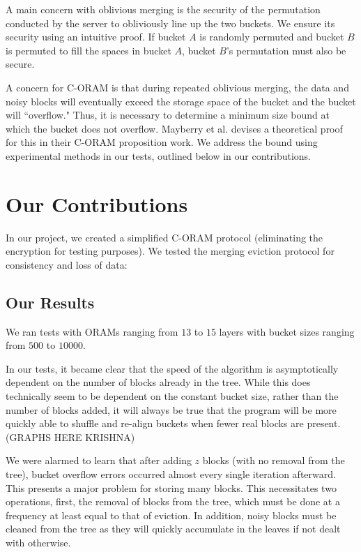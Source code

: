 \documentclass[12pt, oneside]{article}   	%
\begin{document}
A main concern with oblivious merging is the security of the permutation conducted by the server to obliviously line up the two buckets. We ensure its security using an intuitive proof. If bucket $A$ is randomly permuted and bucket $B$ is permuted to fill the spaces in bucket $A$, bucket $B$'s permutation must also be secure. 

A concern for C-ORAM is that during repeated oblivious merging, the data and noisy blocks will eventually exceed the storage space of the bucket and the bucket will ``overflow." Thus, it is necessary to determine a minimum size bound at which the bucket does not overflow. Mayberry et al. devises a theoretical proof for this in their C-ORAM proposition work. We address the bound using experimental methods in our tests, outlined below in our contributions.

\section{Our Contributions}

In our project, we created a simplified C-ORAM protocol (eliminating the encryption for testing purposes). We tested the merging eviction protocol for consistency and loss of data:

\subsection{Our Results}

We ran tests with ORAMs ranging from $13$ to $15$ layers with bucket sizes ranging from $500$ to $10000$.

In our tests, it became clear that the speed of the algorithm is asymptotically dependent on the number of blocks already in the tree. While this does technically seem to be dependent on the constant bucket size, rather than the number of blocks added, it will always be true that the program will be more quickly able to shuffle and re-align buckets when fewer real blocks are present. (GRAPHS HERE KRISHNA)

We were alarmed to learn that after adding $z$ blocks (with no removal from the tree), bucket overflow errors occurred almost every single iteration afterward. This presents a major problem for storing many blocks. This necessitates two operations, first, the removal of blocks from the tree, which must be done at a frequency at least equal to that of eviction. In addition, noisy blocks must be cleaned from the tree as they will quickly accumulate in the leaves if not dealt with otherwise.
\end{document}
